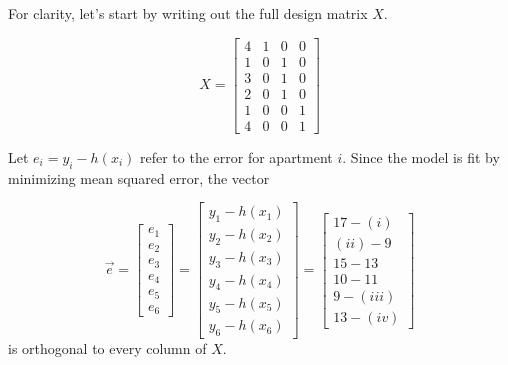 \documentclass[11pt]{article}
\begin{document}
\begin{prob}
\vspace{-0.1in}

\noindent
{}

\begin{solution}
For clarity, let's start by writing out the full design matrix $X$.

$$X = \begin{bmatrix} 
  4 & 1 & 0 & 0 \\
  1 & 0 & 1 & 0 \\ 
  3 & 0 & 1 & 0 \\ 
  2 & 0 & 1 & 0 \\ 
  1 & 0 & 0 & 1 \\ 
  4 & 0 & 0 & 1 \end{bmatrix}$$

Let $e_i = y_i-h(x_i)$ refer to the error for apartment $i$. Since the model is fit by minimizing mean squared error, the vector

$$\vec e = \begin{bmatrix} e_1 \\ e_2 \\ e_3 \\ e_4 \\ e_5 \\ e_6 \end{bmatrix} = \begin{bmatrix} y_1 - h(x_1) \\ y_2 - h(x_2) \\ y_3 - h(x_3) \\ y_4 - h(x_4) \\ y_5 - h(x_5) \\ y_6 - h(x_6) \end{bmatrix} = \begin{bmatrix} 17 - (i) \\ (ii) - 9 \\ 15 - 13 \\ 10 - 11 \\ 9 - (iii) \\ 13 - (iv) \end{bmatrix}$$ is orthogonal to every column of $X$. \\


\end{solution}
\end{prob}
\end{document}
